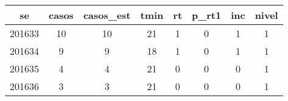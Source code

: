 \begin{tabular}{c|ccccccc}
  \hline
se & casos & casos\_est & tmin & rt & p\_rt1 & inc & nivel \\ 
  \hline
201633 & 10 & 10 & 21 & 1 & 0 & 1 & 1 \\ 
  201634 & 9 & 9 & 18 & 1 & 0 & 1 & 1 \\ 
  201635 & 4 & 4 & 21 & 0 & 0 & 0 & 1 \\ 
  201636 & 3 & 3 & 21 & 0 & 0 & 0 & 1 \\ 
   \hline
\end{tabular}
